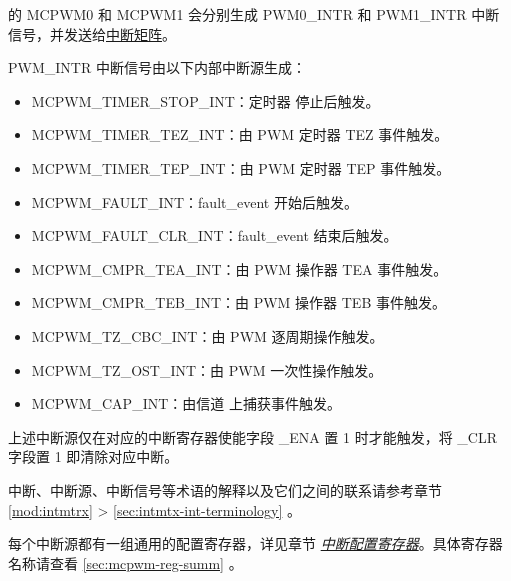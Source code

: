 \documentclass[main\_\_CN.tex]{subfiles}
\begin{document}
\chipname{} 的 MCPWM0 和 MCPWM1 会分别生成 PWM0\_INTR 和 PWM1\_INTR 中断信号，并发送给\hyperref[mod:intmtrx]{中断矩阵}。

PWM\_INTR 中断信号由以下内部中断源生成：

\begin{itemize}
\item \label{int:mcpwm-timer-stop}MCPWM\_TIMER\_STOP\_INT：定时器 停止后触发。
\item \label{int:mcpwm-timer-TEZ}MCPWM\_TIMER\_TEZ\_INT：由 PWM 定时器 TEZ 事件触发。
\item \label{int:mcpwm-timer-tep}MCPWM\_TIMER\_TEP\_INT：由 PWM 定时器 TEP 事件触发。
\item \label{int:mcpwm-fault}MCPWM\_FAULT\_INT：fault\_event 开始后触发。
\item \label{int:mcpwm-fault-clr}MCPWM\_FAULT\_CLR\_INT：fault\_event 结束后触发。
\item \label{int:mcpwm-cmpr-tea}MCPWM\_CMPR\_TEA\_INT：由 PWM 操作器 TEA 事件触发。
\item \label{int:mcpwm-cmpr-teb}MCPWM\_CMPR\_TEB\_INT：由 PWM 操作器 TEB 事件触发。
\item \label{int:mcpwm-tz-cbc}MCPWM\_TZ\_CBC\_INT：由 PWM 逐周期操作触发。
\item \label{int:mcpwm-tz-ost}MCPWM\_TZ\_OST\_INT：由 PWM 一次性操作触发。
\item \label{int:mcpwm-cap}MCPWM\_CAP\_INT：由信道 上捕获事件触发。
\end{itemize}

上述中断源仅在对应的中断寄存器使能字段 \_ENA 置 1 时才能触发，将 \_CLR 字段置 1 即清除对应中断。

\begin{tiplisting}
中断、中断源、中断信号等术语的解释以及它们之间的联系请参考章节 \ref{mod:intmtrx} \textit{} > \ref{sec:intmtx-int-terminology} \textit{}。
\end{tiplisting}

每个中断源都有一组通用的配置寄存器，详见章节 \hyperref[interrupt-config-registers]{\textit{中断配置寄存器}}。具体寄存器名称请查看 \ref{sec:mcpwm-reg-summ} \textit{}。
\end{document}
